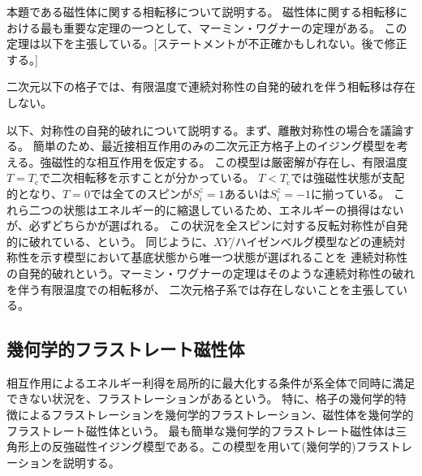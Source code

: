 \documentclass[12pt,titlepage,dvipdfmx]{jarticle}
\begin{document}
本題である磁性体に関する相転移について説明する。
磁性体に関する相転移における最も重要な定理の一つとして、マーミン・ワグナーの定理がある。
この定理は以下を主張している。[ステートメントが不正確かもしれない。後で修正する。]
\begin{center}
   二次元以下の格子では、有限温度で連続対称性の自発的破れを伴う相転移は存在しない。
\end{center}
以下、対称性の自発的破れについて説明する。まず、離散対称性の場合を議論する。
簡単のため、最近接相互作用のみの二次元正方格子上のイジング模型を考える。強磁性的な相互作用を仮定する。
この模型は厳密解が存在し、有限温度$T=T_{\mathrm{c}}$で二次相転移を示すことが分かっている。
$T<T_{\mathrm{c}}$では強磁性状態が支配的となり、$T=0$では全てのスピンが$S_i^z=1$あるいは$S_i^z=-1$に揃っている。
これら二つの状態はエネルギー的に縮退しているため、エネルギーの損得はないが、必ずどちらかが選ばれる。
この状況を全スピンに対する反転対称性が自発的に破れている、という。
同じように、$XY$/ハイゼンベルグ模型などの連続対称性を示す模型において基底状態から唯一つ状態が選ばれることを
連続対称性の自発的破れという。マーミン・ワグナーの定理はそのような連続対称性の破れを伴う有限温度での相転移が、
二次元格子系では存在しないことを主張している。


\newpage

\subsection{幾何学的フラストレート磁性体}
相互作用によるエネルギー利得を局所的に最大化する条件が系全体で同時に満足できない状況を、フラストレーションがあるという。
特に、格子の幾何学的特徴によるフラストレーションを幾何学的フラストレーション、磁性体を幾何学的フラストレート磁性体という。
最も簡単な幾何学的フラストレート磁性体は三角形上の反強磁性イジング模型である。この模型を用いて(幾何学的)フラストレーションを説明する。
\end{document}
